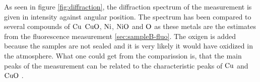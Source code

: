 As seen in figure \ref{fig:diffraction}, the diffraction spectrum of the measurement is given in intensity against angular position. 
The spectrum has been compared to several compounds of $\ce{Cu}$ $\ce{CuO}$, $\ce{Ni}$, $\ce{NiO}$ and $\ce{O}$ as these metals are the estimates from the fluorescence measurement \ref{sec:sampleB-fluo}.
The oxigen is added because the samples are not sealed and it is very likely it would have oxidized in the atmosphere.
What one could get from the comparission is, that the main peaks of the measurement can be related to the characteristic peaks of $\ce{Cu}$ \cite{Cu} and $\ce{CuO}$ \cite{CuO}.







